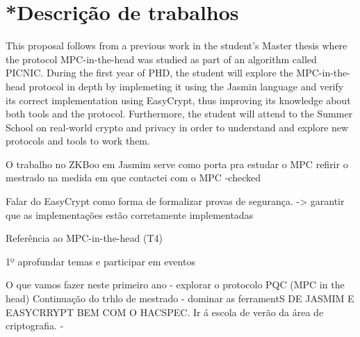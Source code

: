 \documentclass[preprint]{iacrtrans}
\begin{document}
\section{*Descrição de trabalhos}


This proposal follows from a previous work in the student's Master thesis where the protocol MPC-in-the-head was studied as part of an algorithm called PICNIC.
During the first year of PHD, the student will explore the MPC-in-the-head protocol in depth by implemeting it using the Jasmin language and verify its correct implementation using EasyCrypt, thus improving its knowledge about both tools and the protocol. Furthermore, the student will attend to the Summer School on real-world crypto and privacy in order to understand and explore new protocols and tools to work them. 




O trabalho no ZKBoo em Jasmim serve como porta pra estudar o MPC
refirir o mestrado na medida em que contactei com o MPC                  -checked

Falar do EasyCrypt como forma de formalizar provas de segurança. -> garantir que as implementações estão corretamente implementadas  



Referência ao MPC-in-the-head (T4)


1º aprofundar temas e participar em eventos

O que vamos fazer neste primeiro ano - explorar o protocolo PQC (MPC in the head)
Continuação do trhlo  de mestrado - dominar as ferramentS DE JASMIM E EASYCRRYPT BEM COM O HACSPEC.
Ir á escola de verão da área de criptografia. - 








\printbibliography{}
\end{document}
